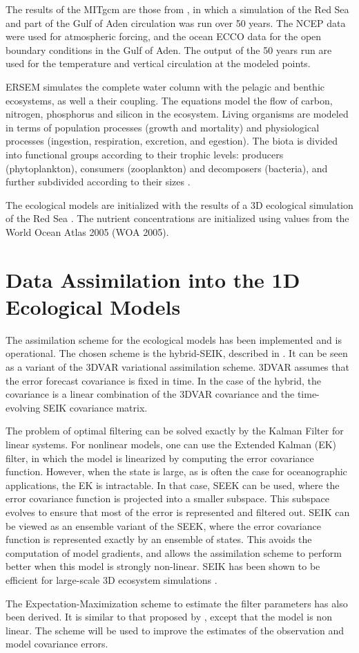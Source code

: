 The results of the MITgcm are those from \citet{Yao2014, Yao2014b}, in which a
simulation of the Red Sea and part of the Gulf of Aden circulation was run over
50 years. The NCEP data were used for atmospheric forcing, and the ocean ECCO
data for the open boundary conditions in the Gulf of Aden. The output of the 50
years run are used for the temperature and vertical circulation at the modeled
points.

ERSEM simulates the complete water column with the pelagic and benthic
ecosystems, as well a their coupling. The equations model the flow of carbon,
nitrogen, phosphorus and silicon in the ecosystem. Living organisms are modeled
in terms of population processes (growth and mortality) and physiological
processes (ingestion, respiration, excretion, and egestion). The biota is
divided into functional groups according to their trophic levels: producers
(phytoplankton), consumers (zooplankton) and decomposers (bacteria), and
further subdivided according to their sizes \citep{Baretta1995}.

The ecological models are initialized with the results of a 3D ecological
simulation of the Red Sea \citep{Triantafyllou2014}. The nutrient
concentrations are initialized using values from the World Ocean Atlas 2005
(WOA 2005).

\section{Data Assimilation into the 1D Ecological Models}

The assimilation scheme for the ecological models has been implemented and is
operational. The chosen scheme is the hybrid-SEIK, described in
\citet{Hamill2000}. It can be seen as a variant of the 3DVAR variational
assimilation scheme. 3DVAR assumes that the error forecast covariance is
fixed in time. In the case of the hybrid, the covariance is a linear combination
of the 3DVAR covariance and the time-evolving SEIK covariance matrix.

The problem of optimal filtering can be solved exactly by the Kalman Filter for
linear systems. For nonlinear models, one can use the Extended Kalman (EK)
filter, in which the model is linearized by computing the error covariance
function.  However, when the state is large, as is often the case for
oceanographic applications, the EK is intractable. In that case, SEEK can be
used, where the error covariance function is projected into a smaller subspace.
This subspace evolves to ensure that most of the error is represented and
filtered out. SEIK can be viewed as an ensemble variant of the SEEK, where the
error covariance function is represented exactly by an ensemble of states. This
avoids the computation of model gradients, and allows the assimilation scheme
to perform better when this model is strongly non-linear. SEIK has been shown
to be efficient for large-scale 3D ecosystem simulations
\citep{Triantfyllou2003}.

The Expectation-Maximization scheme to estimate the filter parameters has also
been derived. It is similar to that proposed by \citet{Tandeo2014}, 
except that the model is non linear. The scheme will be used to improve
the estimates of the observation and model covariance errors.
